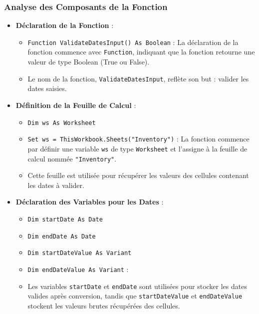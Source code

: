 \documentclass[a4paper, oneside, 12pt, final]{extreport}
\begin{document}
\subsubsection{Analyse des Composants de la Fonction}

\begin{itemize}
    \item \textbf{Déclaration de la Fonction} : 
    \begin{itemize}
        \item \texttt{Function ValidateDatesInput() As Boolean} : La déclaration de la fonction commence avec \texttt{Function}, indiquant que la fonction retourne une valeur de type Boolean (True ou False).
        \item Le nom de la fonction, \texttt{ValidateDatesInput}, reflète son but : valider les dates saisies.
    \end{itemize}
    
    \item \textbf{Définition de la Feuille de Calcul} :
    \begin{itemize}
        \item \texttt{Dim ws As Worksheet}
        \item \texttt{Set ws = ThisWorkbook.Sheets("Inventory")} : La fonction commence par définir une variable \texttt{ws} de type \texttt{Worksheet} et l'assigne à la feuille de calcul nommée \texttt{"Inventory"}.
        \item Cette feuille est utilisée pour récupérer les valeurs des cellules contenant les dates à valider.
    \end{itemize}
    
    \item \textbf{Déclaration des Variables pour les Dates} :
    \begin{itemize}
        \item \texttt{Dim startDate As Date}
        \item \texttt{Dim endDate As Date}
        \item \texttt{Dim startDateValue As Variant}
        \item \texttt{Dim endDateValue As Variant} : 
        \item Les variables \texttt{startDate} et \texttt{endDate} sont utilisées pour stocker les dates valides après conversion, tandis que \texttt{startDateValue} et \texttt{endDateValue} stockent les valeurs brutes récupérées des cellules.
    \end{itemize}
    

\end{itemize}
\end{document}
